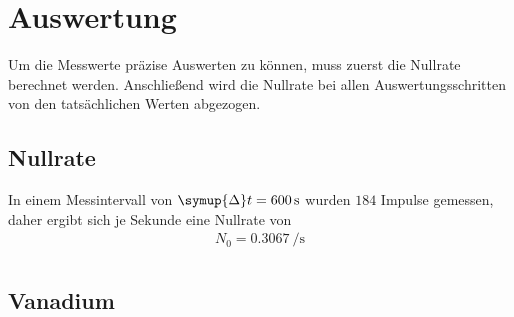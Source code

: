 \section{Auswertung}
\label{sec:Auswertung}

Um die Messwerte präzise Auswerten zu können, muss zuerst die Nullrate berechnet werden.
Anschließend wird die Nullrate bei allen Auswertungsschritten von den tatsächlichen Werten abgezogen.

\subsection{Nullrate}

In einem Messintervall von $\symup{\Delta}t=\qty{600}{\second}$ wurden $184$ Impulse gemessen, daher
ergibt sich je Sekunde eine Nullrate von
\begin{gather*}
    N_0=\qty{0.3067}{\per\second} \\
\end{gather*}

\subsection{Vanadium}

